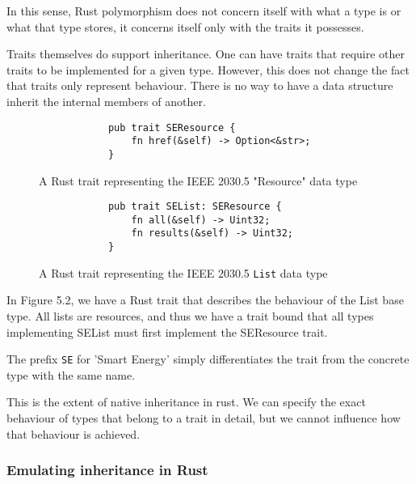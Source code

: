 In this sense, Rust polymorphism does not concern itself with what a type is or what that type stores, it concerns itself only with the traits it possesses.

Traits themselves do support inheritance. One can have traits that require other traits to be implemented for a given type. However, this does not change the fact that traits only represent behaviour. 
There is no way to have a data structure inherit the internal members of another.

\begin{figure}[H]
    \begin{center}
        \begin{lstlisting}
            pub trait SEResource {
                fn href(&self) -> Option<&str>;
            }
        \end{lstlisting}
        \caption{A Rust trait representing the IEEE 2030.5 "Resource" data type}
    \end{center}
\end{figure}



\begin{figure}[H]
    \begin{center}
        \begin{lstlisting}
            pub trait SEList: SEResource {
                fn all(&self) -> Uint32;
                fn results(&self) -> Uint32;
            }
        \end{lstlisting}
        \caption{A Rust trait representing the IEEE 2030.5 \texttt{List} data type}
    \end{center}
\end{figure}

In Figure 5.2, we have a Rust trait that describes the behaviour of the List base type. All lists are resources, and thus we have a trait bound that all types implementing SEList must first implement the SEResource trait.

The prefix \texttt{SE} for 'Smart Energy' simply differentiates the trait from the concrete type with the same name.

This is the extent of native inheritance in rust. We can specify the exact behaviour of types that belong to a trait in detail, but we cannot influence how that behaviour is achieved.

\subsubsection{Emulating inheritance in Rust}

